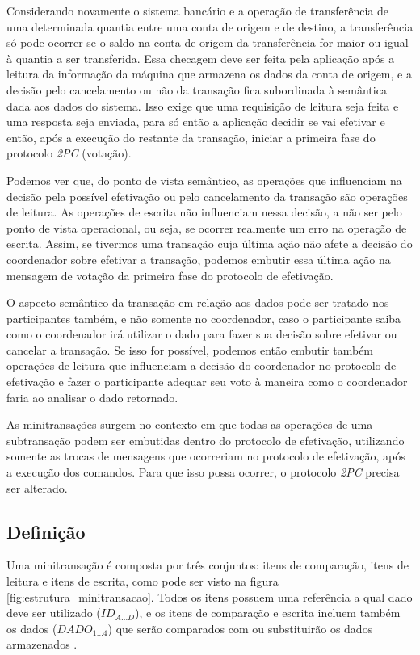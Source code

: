 \documentclass[11pt,twoside,a4paper]{book}
\begin{document}
Considerando novamente o sistema bancário e a operação de transferência de uma determinada quantia entre uma conta de origem e de destino, a transferência só pode ocorrer se o saldo na conta de origem da transferência for maior ou igual à quantia a ser transferida. Essa checagem deve ser feita pela aplicação após a leitura da informação da máquina que armazena os dados da conta de origem, e a decisão pelo cancelamento ou não da transação fica subordinada à semântica dada aos dados do sistema. Isso exige que uma requisição de leitura seja feita e uma resposta seja enviada, para só então a aplicação decidir se vai efetivar e então, após a execução do restante da transação, iniciar a primeira fase do protocolo \emph{2PC} (votação).

Podemos ver que, do ponto de vista semântico, as operações que influenciam na decisão pela possível efetivação ou pelo cancelamento da transação são operações de leitura. As operações de escrita não influenciam nessa decisão, a não ser pelo ponto de vista operacional, ou seja, se ocorrer realmente um erro na operação de escrita. Assim, se tivermos uma transação cuja última ação não afete a decisão do coordenador sobre efetivar a transação, podemos embutir essa última ação na mensagem de votação da primeira fase do protocolo de efetivação.

O aspecto semântico da transação em relação aos dados pode ser tratado nos participantes também, e não somente no coordenador, caso o participante saiba como o coordenador irá utilizar o dado para fazer sua decisão sobre efetivar ou cancelar a transação. Se isso for possível, podemos então embutir também operações de leitura que influenciam a decisão do coordenador no protocolo de efetivação e fazer o participante adequar seu voto à maneira como o coordenador faria ao analisar o dado retornado.

As minitransações surgem no contexto em que todas as operações de uma subtransação podem ser embutidas dentro do protocolo de efetivação, utilizando somente as trocas de mensagens que ocorreriam no protocolo de efetivação, após a execução dos comandos. Para que isso possa ocorrer, o protocolo \emph{2PC} precisa ser alterado.

\subsection{Definição}
\label{subsec:estrutura-minitransacoes}
Uma minitransação é composta por três conjuntos: itens de comparação, itens de leitura e itens de escrita, como pode ser visto na figura \ref{fig:estrutura_minitransacao}. Todos os itens possuem uma referência a qual dado deve ser utilizado ($ID_{A...D}$), e os itens de comparação e escrita incluem também os dados ($DADO_{1...4}$) que serão comparados com ou substituirão os dados armazenados \cite{sinfonia}. 
\end{document}
